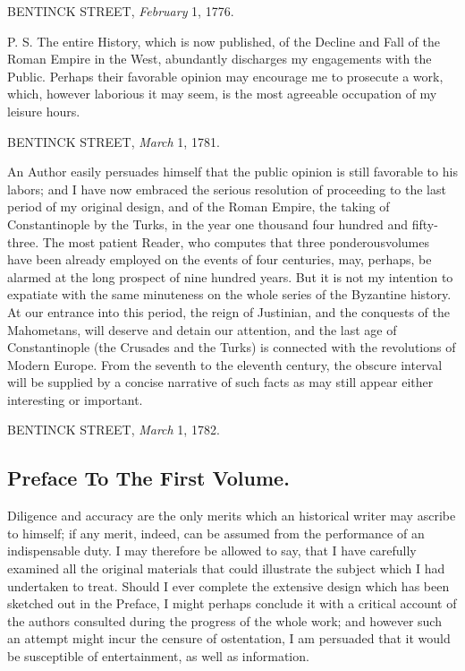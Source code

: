 
BENTINCK STREET, \textit{February} 1, 1776.

P. S. The entire History, which is now published, of the Decline and Fall of the Roman Empire in the West, abundantly discharges my engagements with the Public. Perhaps their favorable opinion may encourage me to prosecute a work, which, however laborious it may seem, is the most agreeable occupation of my leisure hours.

BENTINCK STREET, \textit{March} 1, 1781.

An Author easily persuades himself that the public opinion is still favorable to his labors; and I have now embraced the serious resolution of proceeding to the last period of my original design, and of the Roman Empire, the taking of Constantinople by the Turks, in the year one thousand four hundred and fifty-three. The most patient Reader, who computes that three ponderous\footnotemark[3] volumes have been already employed on the events of four centuries, may, perhaps, be alarmed at the long prospect of nine hundred years. But it is not my intention to expatiate with the same minuteness on the whole series of the Byzantine history. At our entrance into this period, the reign of Justinian, and the conquests of the Mahometans, will deserve and detain our attention, and the last age of Constantinople (the Crusades and the Turks) is connected with the revolutions of Modern Europe. From the seventh to the eleventh century, the obscure interval will be supplied by a concise narrative of such facts as may still appear either interesting or important.

BENTINCK STREET, \textit{March} 1, 1782.



\subsection{Preface To The First Volume.}


Diligence and accuracy are the only merits which an historical writer may ascribe to himself; if any merit, indeed, can be assumed from the performance of an indispensable duty. I may therefore be allowed to say, that I have carefully examined all the original materials that could illustrate the subject which I had undertaken to treat. Should I ever complete the extensive design which has been sketched out in the Preface, I might perhaps conclude it with a critical account of the authors consulted during the progress of the whole work; and however such an attempt might incur the censure of ostentation, I am persuaded that it would be susceptible of entertainment, as well as information.

